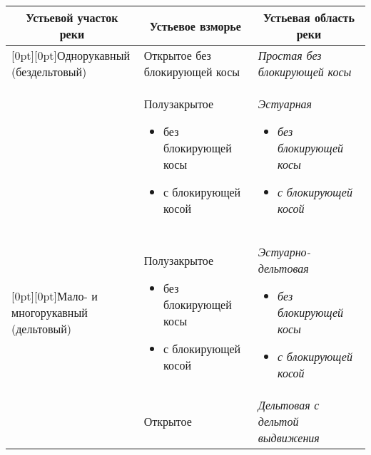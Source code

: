    \begin{table}\small %
   \begin{center}
   \vspace*{2ex}
   
   \begin{tabular}{|p{55mm}|p{40mm}|p{50mm}|}
   \hline
\multicolumn{1}{|c|}{Устьевой участок реки}&\multicolumn{1}{|c|}{Устьевое 
взморье}&\multicolumn{1}{|c|}{Устьевая область реки}\\
\hline
\multicolumn{1}{|l|}{\raisebox{-28pt}[0pt][0pt]{Однорукавный (бездельтовый)}}&Открытое без блокирующей косы&\textit{Простая без 
блокирующей косы}\\
\cline{2-3}
&Полузакрытое
\begin{itemize}
\item без блокирующей косы
\vspace*{-2pt}

\item с блокирующей косой
\end{itemize}&\textit{Эстуарная}
\begin{itemize}
\item \textit{без блокирующей косы}
\vspace*{-2pt}

\item \textit{с блокирующей косой}
\end{itemize}\\[-9pt]
\hline
\multicolumn{1}{|l|}{\raisebox{-22pt}[0pt][0pt]{Мало- и многорукавный (дельтовый)}}&Полузакрытое
\begin{itemize}
\item без блокирующей косы
\vspace*{-2pt}

\item с блокирующей косой
\end{itemize}&\textit{Эстуарно-дельтовая}
\begin{itemize}
\item \textit{без блокирующей косы}
\vspace*{-2pt}

\item \textit{с блокирующей косой}
\end{itemize}\\[-9pt]
\cline{2-3}
&Открытое&\textit{Дельтовая с дельтой выдвижения}\\
\hline
\end{tabular}
\end{center}
\vspace*{-4pt}
\end{table}

